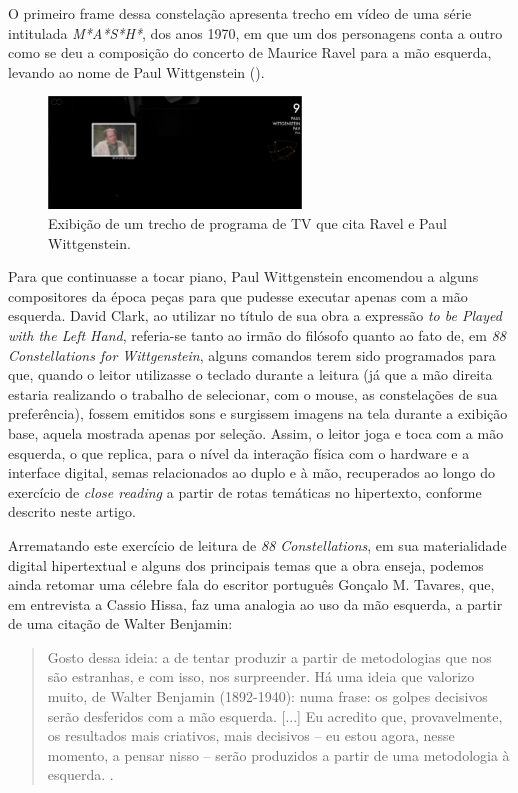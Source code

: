 \documentclass[portuguese]{textolivre}
\begin{document}
O primeiro frame dessa constelação apresenta trecho em vídeo de uma série intitulada \emph{M*A*S*H*}, dos anos 1970, em que um dos personagens conta a outro como se deu a composição do concerto de Maurice Ravel para a mão esquerda, levando ao nome de Paul Wittgenstein ().

\begin{figure}[htbp]
 \centering
 \includegraphics[width=0.6\textwidth]{Fig17[1].jpg}
 \caption{Exibição de um trecho de programa de TV que cita Ravel e Paul Wittgenstein.}
 \label{fig17}
\end{figure}

Para que continuasse a tocar piano, Paul Wittgenstein encomendou a alguns compositores da época peças para que pudesse executar apenas com a mão esquerda. David Clark, ao utilizar no título de sua obra a expressão \emph{to be Played with the Left Hand}, referia-se tanto ao irmão do filósofo quanto ao fato de, em \emph{88 Constellations for Wittgenstein}, alguns comandos terem sido programados para que, quando o leitor utilizasse o teclado durante a leitura (já que a mão direita estaria realizando o trabalho de selecionar, com o mouse, as constelações de sua preferência), fossem emitidos sons e surgissem imagens na tela durante a exibição base, aquela mostrada apenas por seleção. Assim, o leitor joga e toca com a mão esquerda, o que replica, para o nível da interação física com o hardware e a interface digital, semas relacionados ao duplo e à mão, recuperados ao longo do exercício de \emph{close reading} a partir de rotas temáticas no hipertexto, conforme descrito neste artigo. 

Arrematando este exercício de leitura de \emph{88 Constellations}, em sua materialidade digital hipertextual e alguns dos principais temas que a obra enseja, podemos ainda retomar uma célebre fala do escritor português Gonçalo M. Tavares, que, em entrevista a Cassio Hissa, faz uma analogia ao uso da mão esquerda, a partir de uma citação de Walter Benjamin: 

\begin{quote}
Gosto dessa ideia: a de tentar produzir a partir de metodologias que nos são estranhas, e com isso, nos surpreender. Há uma ideia que valorizo muito, de Walter Benjamin (1892-1940): numa frase: os golpes decisivos serão desferidos com a mão esquerda. [...] Eu acredito que, provavelmente, os resultados mais criativos, mais decisivos – eu estou agora, nesse momento, a pensar nisso – serão produzidos a partir de uma metodologia à esquerda. \cite[p. 127]{tavares2011}.
\end{quote}
\end{document}
